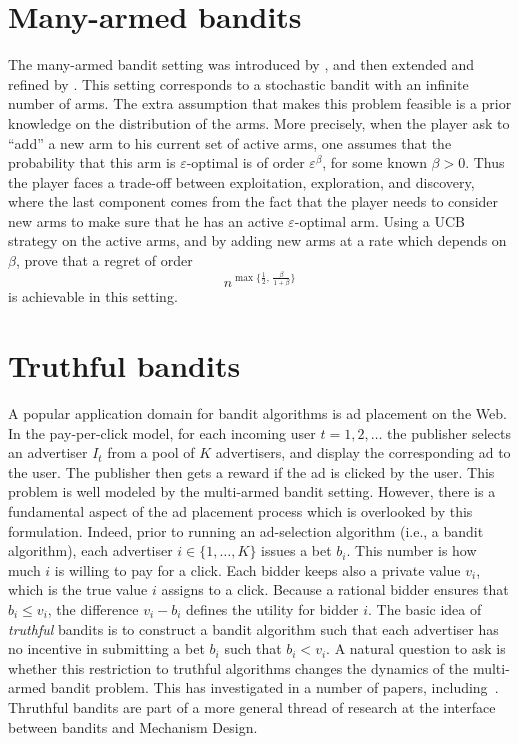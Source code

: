 \documentclass[11pt]{hackednow}
\renewcommand{\epsilon}{\varepsilon}
\begin{document}
\section{Many-armed bandits}
The many-armed bandit setting was introduced by \cite{BCZHS97}, and then extended and refined by \cite{WAM08}. This setting corresponds to a stochastic bandit with an infinite number of arms. The extra assumption that makes this problem feasible is a prior knowledge on the distribution of the arms. More precisely, when the player ask to ``add'' a new arm to his current set of active arms, one assumes that the probability that this arm is $\epsilon$-optimal is of order $\epsilon^{\beta}$, for some known $\beta > 0$. Thus the player faces a trade-off between exploitation, exploration, and discovery, where the last component comes from the fact that the player needs to consider new arms to make sure that he has an active $\epsilon$-optimal arm. Using a UCB strategy on the active arms, and by adding new arms at a rate which depends on $\beta$, \cite{WAM08} prove that a regret of order
\[
    n^{\max \bigl\{\frac12,\, \frac{\beta}{1+\beta}\bigr\}}
\]
is achievable in this setting.

\section{Truthful bandits} \label{sec:truthful}
A popular application domain for bandit algorithms is ad placement on the Web. In the pay-per-click model, for each incoming user $t=1,2,\dots$ the publisher selects an advertiser $I_t$ from a pool of $K$ advertisers, and display the corresponding ad to the user. The publisher then gets a reward if the ad is clicked by the user. This problem is well modeled by the multi-armed bandit setting. However, there is a fundamental aspect of the ad placement process which is overlooked by this formulation. Indeed, prior to running an ad-selection algorithm (i.e., a bandit algorithm), each advertiser $i \in \{1, \hdots, K\}$ issues a bet $b_i$. This number is how much $i$ is willing to pay for a click. Each bidder keeps also a private value $v_i$, which is the true value $i$ assigns to a click. Because a rational bidder ensures that $b_i \le v_i$, the difference $v_i-b_i$ defines the utility for bidder $i$. The basic idea of {\em truthful} bandits is to construct a bandit algorithm such that each advertiser has no incentive in submitting a bet $b_i$ such that $b_i < v_i$. A natural question to ask is whether this restriction to truthful algorithms changes the dynamics of the multi-armed bandit problem. This has investigated in a number of papers, including~\cite{BSS09, DK09, BKS10, WS12}. Thruthful bandits are part of a more general thread of research at the interface between bandits and Mechanism Design.
\end{document}
